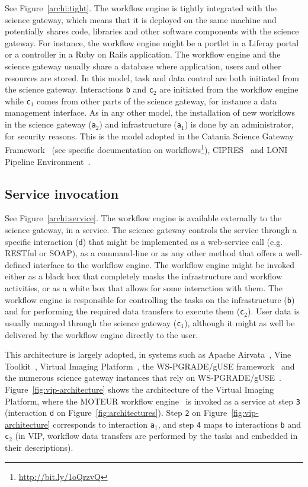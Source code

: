 \documentclass[preprint,3p,twocolumn]{elsarticle}
\begin{document}
See Figure~\ref{archi:tight}. The workflow engine is tightly
integrated with the science gateway, which means that it is deployed
on the same machine and potentially shares code, libraries and other
software components with the science gateway. For instance, the
workflow engine might be a portlet in a Liferay portal or a controller
in a Ruby on Rails application. The workflow engine and the science
gateway usually share a database where application, users and other
resources are stored. In this model, task and data control are both
initiated from the science gateway. Interactions \texttt{b} and
\texttt{c$_2$} are initiated from the workflow engine while
\texttt{c$_1$} comes from other parts of the science gateway, for
instance a data management interface. As in any other model, the
installation of new workflows in the science gateway (\texttt{a$_2$})
and infrastructure (\texttt{a$_1$}) is done by an administrator, for
security reasons. This is the model adopted in the Catania Science
Gateway Framework~\cite{Ardizzone2012} (see specific documentation on
workflows\footnote{\url{http://bit.ly/1oQrzvQ}}),
CIPRES~\cite{miller2010creating} and LONI Pipeline
Environment~\cite{dinov2009efficient}.


\subsection{Service invocation}

See Figure~\ref{archi:service}. The workflow engine is available
externally to the science gateway, in a service. The science gateway
controls the service through a specific interaction (\texttt{d}) that
might be implemented as a web-service call (e.g. RESTful or SOAP), as
a command-line or as any other method that offers a well-defined
interface to the workflow engine. The workflow engine might be invoked
either as a black box that completely masks the infrastructure and
workflow activities, or as a white box that allows for some
interaction with them. The workflow engine is responsible for
controlling the tasks on the infrastructure (\texttt{b}) and for
performing the required data transfers to execute them
(\texttt{c$_2$}). User data is usually managed through the science
gateway (\texttt{c$_1$}), although it might as well be delivered by
the workflow engine directly to the user.

This architecture is largely adopted, in systems such as Apache
Airvata~\cite{marru2011apache}, Vine
Toolkit~\cite{DBLP:journals/scpe/SzejnfeldDKKKKLPTWDNW10}, Virtual
Imaging Platform~\cite{GLAT-13}, the WS-PGRADE/gUSE
framework~\cite{Kacsuk2012} and the numerous science gateway instances
that rely on
WS-PGRADE/gUSE~\cite{kacsuk2014science}. Figure~\ref{fig:vip-architecture}
shows the architecture of the Virtual Imaging Platform, where the
MOTEUR workflow engine~\cite{GLAT-08i} is invoked as a service at step
\texttt{3} (interaction \texttt{d} on
Figure~\ref{fig:architectures}). Step \texttt{2} on
Figure~\ref{fig:vip-architecture} corresponds to interaction
\texttt{a$_1$}, and step \texttt{4} maps to interactions \texttt{b}
and \texttt{c$_2$} (in VIP, workflow data transfers are performed by
the tasks and embedded in their descriptions).
\end{document}
